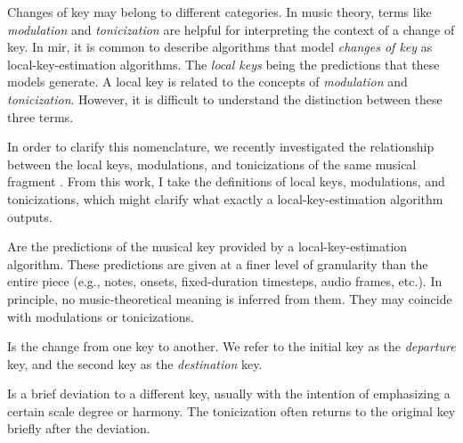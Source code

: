 

Changes of key may belong to different categories. In music
theory, terms like \emph{modulation} and \emph{tonicization}
are helpful for interpreting the context of a change of key.
In \gls{mir}, it is common to describe algorithms that model
\emph{changes of key} as local-key-estimation algorithms.
The \emph{local keys} being the predictions that these
models generate. A local key is related to the concepts of
\emph{modulation} and \emph{tonicization}. However, it is
difficult to understand the distinction between these three
terms.

In order to clarify this nomenclature, we recently
investigated the relationship between the local keys,
modulations, and tonicizations of the same musical fragment
\parencite{napoleslopez2020local}. From this work, I
take the definitions of local keys, modulations, and tonicizations, which might clarify what exactly a local-key-estimation algorithm outputs.

Are the predictions of the musical key provided by a
local-key-estimation algorithm. These predictions are given
at a finer level of granularity than the entire piece (e.g.,
notes, onsets, fixed-duration timesteps, audio frames,
etc.). In principle, no music-theoretical meaning is
inferred from them. They may coincide with modulations or
tonicizations.

Is the change from one key to another. We refer to the
initial key as the \emph{departure} key, and the second key
as the \emph{destination} key.

Is a brief deviation to a different key, usually with the
intention of emphasizing a certain scale degree or harmony.
The tonicization often returns to the original key briefly
after the deviation.
